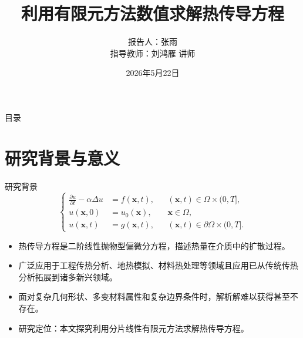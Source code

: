 \documentclass[aspectratio=169, xetex, 12pt]{beamer}  %
\title{利用有限元方法数值求解热传导方程}
\author[张雨]{报告人：张雨\\ \vspace{0.2cm} 指导教师：刘鸿雁 \quad 讲师}
\institute{贵州大学\\数学与统计学院}
\date{2026年5月22日}
\begin{document}
	
	\begin{frame}
		\titlepage
	\end{frame}
	
	\begin{frame}{目录}
		\tableofcontents
	\end{frame}
	
	\section{研究背景与意义}
	
\begin{frame}{研究背景}
\[
\left\{
\begin{aligned}
	\frac{\partial u}{\partial t} - \alpha \Delta u &= f(\boldsymbol{x},t), && (\boldsymbol{x},t) \in \Omega \times (0,T], \\
	u(\boldsymbol{x},0) &= u_0(\boldsymbol{x}), && \boldsymbol{x} \in \Omega, \\
	u(\boldsymbol{x},t) &= g(\boldsymbol{x},t), && (\boldsymbol{x},t) \in \partial\Omega \times (0,T].
\end{aligned}
\right.
\]
	\begin{itemize}
		\setlength{\itemsep}{0.7em}   %
		\item 热传导方程是二阶线性抛物型偏微分方程，描述热量在介质中的扩散过程。
		\item 广泛应用于工程传热分析、地热模拟、材料热处理等领域且应用已从传统传热分析拓展到诸多新兴领域。
		\item 面对复杂几何形状、多变材料属性和复杂边界条件时，解析解难以获得甚至不存在。
			\vspace{0.3em}
		\item 研究定位：本文探究利用分片线性有限元方法求解热传导方程。
	\end{itemize}
\end{frame}
\end{document}
